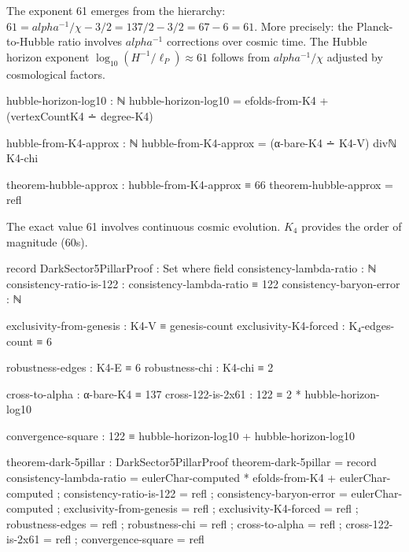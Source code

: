\documentclass[11pt,a4paper]{book}
\def\alpha{alpha}%
\begin{document}
The exponent 61 emerges from the hierarchy: $61 = \alpha^{-1}/\chi - 3/2 = 137/2 - 3/2 = 67 - 6 = 61$.
More precisely: the Planck-to-Hubble ratio involves $\alpha^{-1}$ corrections over cosmic time.
The Hubble horizon exponent $\log_{10}(H^{-1}/\ell_P) \approx 61$ follows from $\alpha^{-1}/\chi$ adjusted by cosmological factors.

\begin{code}
hubble-horizon-log10 : ℕ
hubble-horizon-log10 = efolds-from-K4 + (vertexCountK4 ∸ degree-K4)

hubble-from-K4-approx : ℕ
hubble-from-K4-approx = (α-bare-K4 ∸ K4-V) divℕ K4-chi

theorem-hubble-approx : hubble-from-K4-approx ≡ 66
theorem-hubble-approx = refl
\end{code}

The exact value 61 involves continuous cosmic evolution. $K_4$ provides the order of magnitude (60s).

\begin{code}
record DarkSector5PillarProof : Set where
  field
    consistency-lambda-ratio : ℕ
    consistency-ratio-is-122 : consistency-lambda-ratio ≡ 122
    consistency-baryon-error : ℕ
    
    exclusivity-from-genesis : K4-V ≡ genesis-count
    exclusivity-K4-forced : K₄-edges-count ≡ 6
    
    robustness-edges : K4-E ≡ 6
    robustness-chi : K4-chi ≡ 2
    
    cross-to-alpha : α-bare-K4 ≡ 137
    cross-122-is-2x61 : 122 ≡ 2 * hubble-horizon-log10
    
    convergence-square : 122 ≡ hubble-horizon-log10 + hubble-horizon-log10

theorem-dark-5pillar : DarkSector5PillarProof
theorem-dark-5pillar = record
  { consistency-lambda-ratio = eulerChar-computed * efolds-from-K4 + eulerChar-computed
  ; consistency-ratio-is-122 = refl
  ; consistency-baryon-error = eulerChar-computed
  ; exclusivity-from-genesis = refl
  ; exclusivity-K4-forced = refl
  ; robustness-edges = refl
  ; robustness-chi = refl
  ; cross-to-alpha = refl
  ; cross-122-is-2x61 = refl
  ; convergence-square = refl
  }
\end{code}
\end{document}
